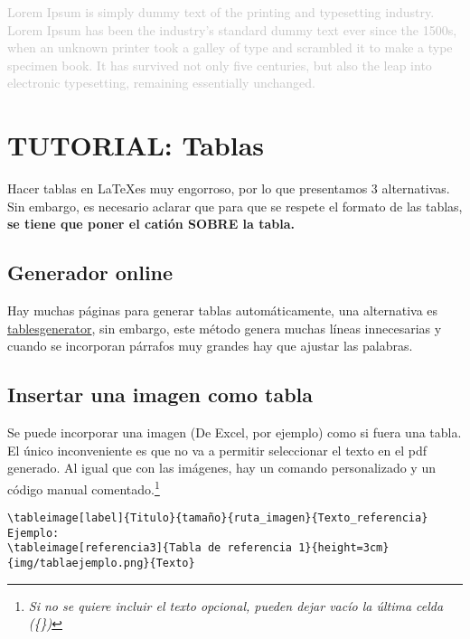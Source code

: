 

\textcolor{silver}{
    Lorem Ipsum is simply dummy text of the printing and typesetting industry. Lorem Ipsum has been the industry's standard dummy text ever since the 1500s, when an unknown printer took a galley of type and scrambled it to make a type specimen book. It has survived not only five centuries, but also the leap into electronic typesetting, remaining essentially unchanged.
    }

\newpage

\section{TUTORIAL: Tablas}

Hacer tablas en \LaTeX es muy engorroso, por lo que presentamos 3 alternativas. Sin embargo, es necesario aclarar que para que se respete el formato de las tablas, \textbf{se tiene que poner el catión SOBRE la tabla.}

\subsection{Generador online}
Hay muchas páginas para generar tablas automáticamente, una alternativa es \href{https://www.tablesgenerator.com}{tablesgenerator}, sin embargo, este método genera muchas líneas innecesarias y cuando se incorporan párrafos muy grandes hay que ajustar las palabras.

\subsection{Insertar una imagen como tabla}
Se puede incorporar una imagen (De Excel, por ejemplo) como si fuera una tabla. El único inconveniente es que no va a permitir seleccionar el texto en el pdf generado. Al igual que con las imágenes, hay un comando personalizado y un código manual comentado.\footnote{\textit{Si no se quiere incluir el texto opcional, pueden dejar vacío la última celda (\{\})}}
\begin{verbatim} 
\tableimage[label]{Titulo}{tamaño}{ruta_imagen}{Texto_referencia}
Ejemplo:
\tableimage[referencia3]{Tabla de referencia 1}{height=3cm}{img/tablaejemplo.png}{Texto}
\end{verbatim}



